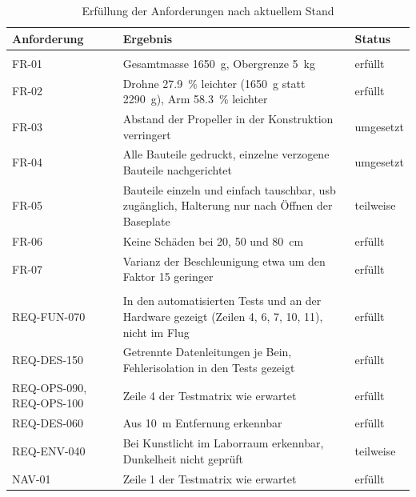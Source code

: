    \begin{table}[H]
        \centering
        \caption{Erfüllung der Anforderungen nach aktuellem Stand}
        \label{tab:Erg_Anforderungen}
        \small
        \begin{tabularx}{\textwidth}{>{\raggedright\arraybackslash}p{2.6cm} X l}
            \toprule
            \textbf{Anforderung} & \textbf{Ergebnis} & \textbf{Status} \\
            \midrule
            \multicolumn{3}{l}{\textit{Frame}} \\
            FR-01 & Gesamtmasse \SI{1650}{\gram}, Obergrenze \SI{5}{\kilo\gram} & erfüllt \\
            FR-02 & Drohne \SI{27,9}{\percent} leichter (\SI{1650}{\gram} statt \SI{2290}{\gram}), Arm \SI{58,3}{\percent} leichter & erfüllt \\
            FR-03 & Abstand der Propeller in der Konstruktion verringert & umgesetzt \\
            FR-04 & Alle Bauteile gedruckt, einzelne verzogene Bauteile nachgerichtet & umgesetzt \\
            FR-05 & Bauteile einzeln und einfach tauschbar, \gls{usb} zugänglich, Halterung nur nach Öffnen der Baseplate & teilweise \\
            FR-06 & Keine Schäden bei 20, 50 und \SI{80}{\centi\metre} & erfüllt \\
            FR-07 & Varianz der Beschleunigung etwa um den Faktor 15 geringer & erfüllt \\
            \midrule
            \multicolumn{3}{l}{\textit{Statusanzeige}} \\
            REQ-FUN-070 & In den automatisierten Tests und an der Hardware gezeigt (Zeilen 4, 6, 7, 10, 11), nicht im Flug & erfüllt \\
            REQ-DES-150 & Getrennte Datenleitungen je Bein, Fehlerisolation in den Tests gezeigt & erfüllt \\
            REQ-OPS-090, REQ-OPS-100 & Zeile 4 der Testmatrix wie erwartet & erfüllt \\
            REQ-DES-060 & Aus \SI{10}{\metre} Entfernung erkennbar & erfüllt \\
            REQ-ENV-040 & Bei Kunstlicht im Laborraum erkennbar, Dunkelheit nicht geprüft & teilweise \\
            NAV-01 & Zeile 1 der Testmatrix wie erwartet & erfüllt \\
            \bottomrule
        \end{tabularx}
    \end{table}


